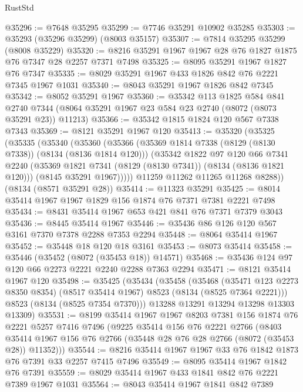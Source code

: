 \begin{lexlean}{RustStd}
\begin{coremodule}
{\begin{coremodule}
{{{{{{{{{{{{{{{{{{{{{{{{{{{{{{{{{{{{{{{{{{{{{{{{{{{{{@35296 := @7648 @35295
@35299 := @7746 @35291 @10902 @35285
@35303 := @35293 (@35296 @35299) (@8003 @35157)
@35307 := @7814 @35295 @35299 (@8008 @35229)
@35320 := @8216 @35291 @1967 @1967 @28 @76 @1827 @1875 @76 @7347 @28 @2257 @7371 @7498
@35325 := @8095 @35291 @1967 @1827 @76 @7347
@35335 := @8029 @35291 @1967 @433 @1826 @842 @76 @2221 @7345 @1967 @1031
@35340 := @8043 @35291 @1967 @1826 @842 @7345
@35342 := @8052 @35291 @1967
@35360 := @35342
    @113
    @1825
    @584
    @841
    @2740
    @7344
    (@8064 @35291 @1967 @23 @584 @23 @2740 (@8072 (@8073 @35291 @23)) @11213)
@35366 := @35342 @1815 @1824 @120 @567 @7338 @7343
@35369 := @8121 @35291 @1967 @120
@35413 := @35320
    (@35325
      (@35335
        (@35340
          (@35360
            (@35366
              (@35369 @1814 @7338 (@8129 (@8130 @7338)) (@8134 (@8136 @1814 @120)))
              (@35342
                @1822
                @97
                @120
                @66
                @7341
                @2240
                (@35369 @1821 @7341 (@8129 (@8130 @7341)) (@8134 (@8136 @1821 @120)))
                (@8145 @35291 @1967)))))
        @11259
        @11262
        @11265
        @11268
        @8288))
    (@8134 (@8571 @35291 @28))
@35414 := @11323 @35291
@35425 := @8014 @35414 @1967 @1967 @1829 @156 @1874 @76 @7371 @7381 @2221 @7498
@35434 := @8431 @35414 @1967 @653 @421 @841 @76 @7371 @7379 @3043
@35436 := @8445 @35414 @1967
@35446 := @35436 @86 @126 @120 @567 @3161 @7370 @7378 @2288 @7353 @2294
@35448 := @8064 @35414 @1967
@35452 := @35448 @18 @120 @18 @3161
@35453 := @8073 @35414
@35458 := @35446 (@35452 (@8072 (@35453 @18)) @14571)
@35468 := @35436 @124 @97 @120 @66 @2273 @2221 @2240 @2288 @7363 @2294
@35471 := @8121 @35414 @1967 @120
@35498 := @35425
    (@35434
      (@35458
        (@35468
          (@35471 @123 @2273 @8350 @8354)
          (@8517 @35414 @1967)
          @8523
          (@8134 (@8525 @7364 @2221)))
        @8523
        (@8134 (@8525 @7354 @7370)))
      @13288
      @13291
      @13294
      @13298
      @13303
      @13309)
@35531 := @8199
    @35414
    @1967
    @1967
    @8203
    @7381
    @156
    @1874
    @76
    @2221
    @5257
    @7416
    @7496
    (@9225
      @35414
      @156
      @76
      @2221
      @2766
      (@8403 @35414 @1967 @156 @76 @2766 (@35448 @28 @76 @28 @2766 (@8072 (@35453 @28)) @11352)))
@35544 := @8216 @35414 @1967 @1967 @33 @76 @1842 @1873 @76 @7391 @33 @2257 @7415 @7496
@35549 := @8095 @35414 @1967 @1842 @76 @7391
@35559 := @8029 @35414 @1967 @433 @1841 @842 @76 @2221 @7389 @1967 @1031
@35564 := @8043 @35414 @1967 @1841 @842 @7389
}}}}}}}}}}}}}}}}}}}}}}}}}}}}}}}}}}}}}}}}}}}}}}}}}}}}}
\end{coremodule}}
\end{coremodule}
\end{lexlean}
